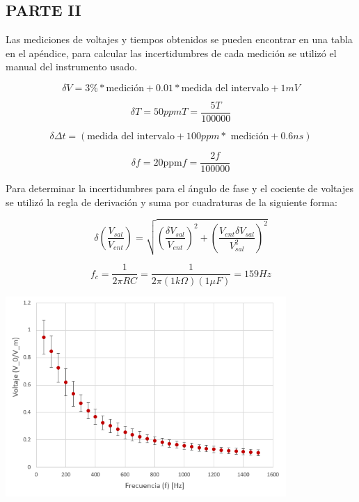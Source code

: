 \documentclass[DIV=calc, paper=a4, fontsize=11pt]{scrartcl}
\newenvironment{Figura}
  {\par\medskip\noindent\minipage{\linewidth}}
  {\endminipage\par\medskip}
\begin{document}
\begin{multicols}{2}
\subsection*{PARTE II}

Las mediciones de voltajes y tiempos obtenidos se pueden encontrar en una tabla en el apéndice, para calcular las incertidumbres de cada medición se utilizó el manual del instrumento usado.

\begin{equation*}
    \delta V = 3\% * \text{medición} + 0.01 * \text{medida del intervalo} + 1mV
\end{equation*}

\begin{equation*}
    \delta T = 50 ppm T = \frac{5T}{100000} 
\end{equation*}

 \begin{equation*}
     \delta \Delta t = (\text{medida del intervalo} + 100 ppm * \text{ medición} + 0.6 ns)
 \end{equation*}
 
 \begin{equation*}
    \delta f = 20 \text{ppm} f = \frac{2f}{100000} 
\end{equation*}

Para determinar la incertidumbres para el ángulo de fase y el cociente de voltajes se utilizó la regla de derivación y suma por cuadraturas de la siguiente forma:



\begin{equation*}
    \delta \left(\frac{V_{sal}}{V_{ent}}\right) = \sqrt{\left(\frac{\delta V_{sal}}{V_{ent}}\right)^2 + \left(\frac{V_{ent} \delta V_{sal}}{V_{sal}^{2}}\right)^2}
\end{equation*}



\begin{equation*}
    f_c = \frac{1}{2 \pi R C} = \frac{1}{2 \pi (1k \Omega) (1 \mu F)} = 159 Hz
\end{equation*}

\begin{Figura}
    \centering
    \includegraphics[width=0.8\textwidth]{grafica V.PNG}
    \label{fig}
\end{Figura}





\end{multicols}
\end{document}
